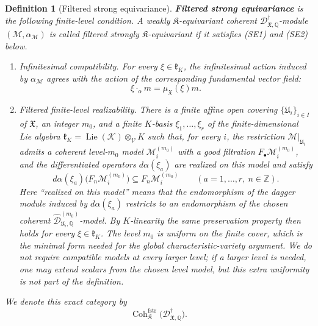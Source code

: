\documentclass[10pt,a4paper]{amsart}
\newtheorem{definition}{Definition}
\newcommand{\Coh}{\operatorname{Coh}}
\newcommand{\Lie}{\operatorname{Lie}}
\newcommand{\fstr}{\mathrm{fstr}}
\begin{document}
\begin{definition}[Filtered strong equivariance]
\label{def:strong-equivariance}
\textup{\textbf{Filtered strong equivariance}} is the following finite-level
condition.  A weakly \(\mathfrak K\)-equivariant coherent
\(\mathscr D^\dagger_{\mathfrak X,\mathbb Q}\)-module
\((\mathcal M,\alpha_{\mathcal M})\) is called filtered strongly
\(\mathfrak K\)-equivariant if it satisfies \textup{(SE1)} and
\textup{(SE2)} below.
\begin{enumerate}[label=\textup{(SE\arabic*)}]
\item \emph{Infinitesimal compatibility.}  For every
\(\xi\in\mathfrak k_K\), the infinitesimal action induced by
\(\alpha_{\mathcal M}\) agrees with the action of the corresponding
fundamental vector field:
\[
  \xi\cdot_{\alpha}m=\mu_{\mathfrak X}(\xi)m.
\]
\item \emph{Filtered finite-level realizability.} There is a finite
affine open covering \(\{\mathfrak U_i\}_{i\in I}\) of
\(\mathfrak X\), an integer \(m_0\), and a finite \(K\)-basis
\(\xi_1,\ldots,\xi_r\) of the finite-dimensional Lie algebra
\(\mathfrak k_K=\Lie(\mathcal K)\otimes_{\mathcal V}K\) such that, for every
\(i\), the restriction \(\mathcal M|_{\mathfrak U_i}\) admits a coherent
level-\(m_0\) model \(\mathcal M_i^{(m_0)}\) with a good filtration
\(F_\bullet\mathcal M_i^{(m_0)}\), and the differentiated operators
\(d\alpha(\xi_a)\) are realized on this model and satisfy
\[
  d\alpha(\xi_a)\bigl(F_n\mathcal M_i^{(m_0)}\bigr)
  \subseteq F_n\mathcal M_i^{(m_0)}
  \qquad(a=1,\ldots,r,\ n\in\mathbb Z).
\]
Here ``realized on this model'' means that the endomorphism of the dagger
module induced by \(d\alpha(\xi_a)\) restricts to an endomorphism of the
chosen coherent
\(\widehat{\mathscr D}^{(m_0)}_{\mathfrak U_i,\mathbb Q}\)-model.  By
\(K\)-linearity the same preservation property then holds for every
\(\xi\in\mathfrak k_K\).  The level \(m_0\) is uniform on the finite cover,
which is the minimal form needed for the global characteristic-variety
argument.  We do not require compatible models at every larger level; if a
larger level is needed, one may extend scalars from the chosen level model, but
this extra uniformity is not part of the definition.
\end{enumerate}
We denote this exact category by
\[
  \Coh^{\fstr}_{\mathfrak K}
  \bigl(\mathscr D^\dagger_{\mathfrak X,\mathbb Q}\bigr).
\]
\end{definition}
\end{document}
